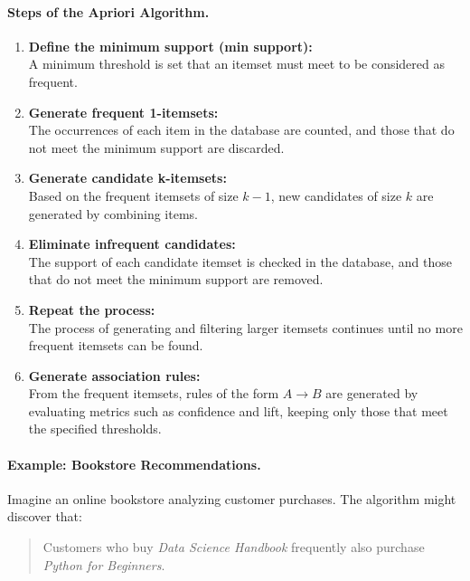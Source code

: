 \documentclass{svproc} %
\begin{document}
	\paragraph{Steps of the Apriori Algorithm.}
	
	\begin{enumerate}
		\item \textbf{Define the minimum support (min support):} \\
		A minimum threshold is set that an itemset must meet to be considered as frequent.
		
		\item \textbf{Generate frequent 1-itemsets:} \\
		The occurrences of each item in the database are counted, and those that do not meet the minimum support are discarded.
		
		\item \textbf{Generate candidate k-itemsets:} \\
		Based on the frequent itemsets of size \(k-1\), new candidates of size \(k\) are generated by combining items.
		
		\item \textbf{Eliminate infrequent candidates:} \\
		The support of each candidate itemset is checked in the database, and those that do not meet the minimum support are removed.
		
		\item \textbf{Repeat the process:} \\
		The process of generating and filtering larger itemsets continues until no more frequent itemsets can be found.
		
		\item \textbf{Generate association rules:} \\
		From the frequent itemsets, rules of the form \(A \rightarrow B\) are generated by evaluating metrics such as confidence and lift, keeping only those that meet the specified thresholds.
	\end{enumerate}
	\paragraph{Example: Bookstore Recommendations.}
	
	Imagine an online bookstore analyzing customer purchases. The algorithm might discover that:
	
	\begin{quote}
		Customers who buy \textit{Data Science Handbook} frequently also purchase \textit{Python for Beginners}.
	\end{quote}
	
\end{document}
